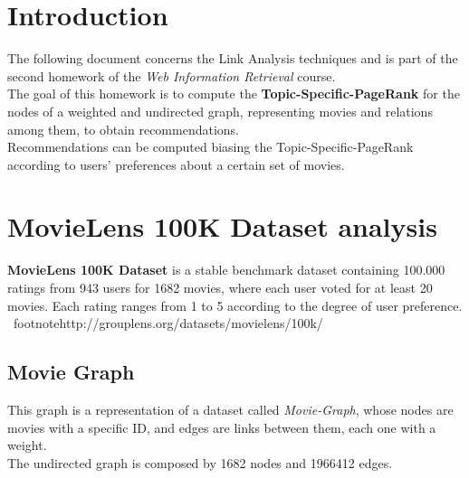 \documentclass[11pt]{article}
\begin{document}
\section{Introduction}
The following document concerns the Link Analysis techniques and is part of the second homework
of the \textit{Web Information Retrieval} course.\\
The goal of this homework is to compute the \textbf{Topic-Specific-PageRank} for the nodes of
a weighted and undirected graph, representing movies and relations among them, to obtain recommendations.\\
Recommendations can be computed biasing the Topic-Specific-PageRank according to users' preferences about
a certain set of movies.

\section{MovieLens 100K Dataset analysis}
\textbf{MovieLens 100K Dataset} is a stable benchmark dataset containing
 100.000 ratings from 943 users for 1682 movies, where each user voted for at least 20 movies.
 Each rating ranges from 1 to 5 according to the degree of user preference.
 \ footnote{http://grouplens.org/datasets/movielens/100k/} \\
\subsection{Movie Graph}
This graph is a representation of a dataset called \textit{Movie\--Graph}, whose nodes are movies
with a specific ID, and edges are links between them, each one with a weight.\\
The undirected graph is composed by 1682 nodes and 1966412 edges.
\end{document}
